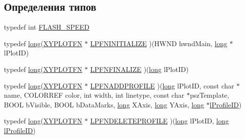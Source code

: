 \subsection*{Определения типов}
\begin{DoxyCompactItemize}
\item 
typedef int \hyperlink{namespacexyplot_aef2fa49b82f49b1152511044149c60bb}{F\-L\-A\-S\-H\-\_\-\-S\-P\-E\-E\-D}
\item 
typedef \hyperlink{namespacexyplot_a27bc71b0bdfac09495e7e531d8a918c5}{long}(\hyperlink{_x_y_plot_wrapper_8h_aba6cc8b3b62f2540637745c385e17016}{X\-Y\-P\-L\-O\-T\-F\-N} $\ast$ \hyperlink{namespacexyplot_a8c5635641ba2648c95a8b29c01393f78}{L\-P\-F\-N\-I\-N\-I\-T\-I\-A\-L\-I\-Z\-E} )(H\-W\-N\-D hwnd\-Main, \hyperlink{namespacexyplot_a27bc71b0bdfac09495e7e531d8a918c5}{long} $\ast$l\-Plot\-I\-D)
\item 
typedef \hyperlink{namespacexyplot_a27bc71b0bdfac09495e7e531d8a918c5}{long}(\hyperlink{_x_y_plot_wrapper_8h_aba6cc8b3b62f2540637745c385e17016}{X\-Y\-P\-L\-O\-T\-F\-N} $\ast$ \hyperlink{namespacexyplot_a0c97b982a01a1c43f6900a274d295b11}{L\-P\-F\-N\-F\-I\-N\-A\-L\-I\-Z\-E} )(\hyperlink{namespacexyplot_a27bc71b0bdfac09495e7e531d8a918c5}{long} l\-Plot\-I\-D)
\item 
typedef \hyperlink{namespacexyplot_a27bc71b0bdfac09495e7e531d8a918c5}{long}(\hyperlink{_x_y_plot_wrapper_8h_aba6cc8b3b62f2540637745c385e17016}{X\-Y\-P\-L\-O\-T\-F\-N} $\ast$ \hyperlink{namespacexyplot_ab78664aa6b50a88a556408cdcb0fedde}{L\-P\-F\-N\-A\-D\-D\-P\-R\-O\-F\-I\-L\-E} )(\hyperlink{namespacexyplot_a27bc71b0bdfac09495e7e531d8a918c5}{long} l\-Plot\-I\-D, const char $\ast$name, C\-O\-L\-O\-R\-R\-E\-F color, int width, int linetype, const char $\ast$psz\-Template, B\-O\-O\-L b\-Visible, B\-O\-O\-L b\-Data\-Marks, \hyperlink{namespacexyplot_a27bc71b0bdfac09495e7e531d8a918c5}{long} X\-Axis, \hyperlink{namespacexyplot_a27bc71b0bdfac09495e7e531d8a918c5}{long} Y\-Axis, \hyperlink{namespacexyplot_a27bc71b0bdfac09495e7e531d8a918c5}{long} $\ast$\hyperlink{namespacexyplot_a37f2e7672aa877ee74f4ab91e6a97a88}{l\-Profile\-I\-D})
\item 
typedef \hyperlink{namespacexyplot_a27bc71b0bdfac09495e7e531d8a918c5}{long}(\hyperlink{_x_y_plot_wrapper_8h_aba6cc8b3b62f2540637745c385e17016}{X\-Y\-P\-L\-O\-T\-F\-N} $\ast$ \hyperlink{namespacexyplot_af6412b804e2c4c568501d1a6e84358cd}{L\-P\-F\-N\-D\-E\-L\-E\-T\-E\-P\-R\-O\-F\-I\-L\-E} )(\hyperlink{namespacexyplot_a27bc71b0bdfac09495e7e531d8a918c5}{long} l\-Plot\-I\-D, \hyperlink{namespacexyplot_a27bc71b0bdfac09495e7e531d8a918c5}{long} \hyperlink{namespacexyplot_a37f2e7672aa877ee74f4ab91e6a97a88}{l\-Profile\-I\-D})

\end{DoxyCompactItemize}
